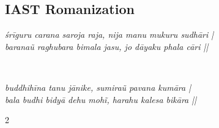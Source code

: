 \newpage

\subsection*{IAST Romanization}

{ %
\large \linespread{1.5}\selectfont
\setcounter{chaupainum}{0} %

\begin{center}
    \begin{minipage}{0.8\linewidth}
        \centering
        \large \textit{śrīguru carana saroja raja, nija manu mukuru sudhāri |} \\ 
        \large \textit{baranaũ raghubara bimala jasu, jo dāyaku phala cāri ||}
    \end{minipage} \\[1em]
    
    \begin{minipage}{0.8\linewidth}
        \centering
        \large \textit{buddhihīna tanu jānike, sumiraũ pavana kumāra |} \\ 
        \large \textit{bala budhi bidyā dehu mohĩ, harahu kalesa bikāra ||}
    \end{minipage}
\end{center}

\vspace{1em}

\setlength{\columnsep}{40pt} %
\begin{multicols}{2}
\raggedcolumns 

\newcommand{\cpiast}[2]{%
    \refstepcounter{chaupainum}%
    \begin{minipage}{\linewidth}
        \begin{tabular}{@{}p{1ex} p{0.88\linewidth}@{}}
            \small \textcolor{gray}{\arabic{chaupainum}.} & 
            \large \textit{#1} \\
            & \large \textit{#2}
        \end{tabular}
    \end{minipage}\\[0.8em]
}


\end{multicols}}
